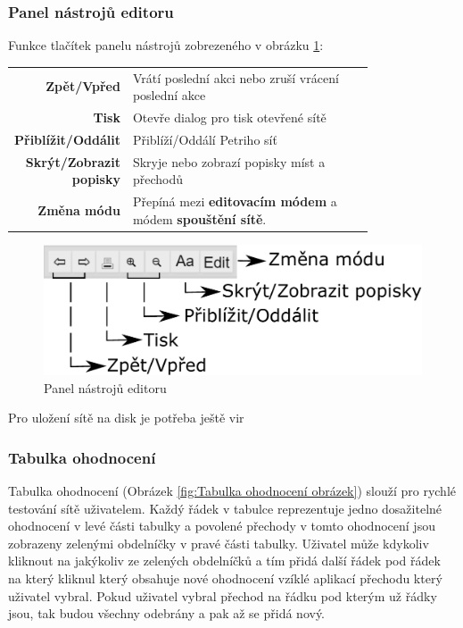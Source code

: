 \documentclass[
  biblatex,
  glossaries,
  index
]{kidiplom}
\begin{document}

\subsubsection{Panel nástrojů editoru}\label{panel nástrojů}

Funkce tlačítek panelu nástrojů zobrezeného v obrázku \ref{fig:Panel nástrojů editoru}:
\begin{center}
  \begin{tabular}{r p{0.8\linewidth}}
    \textbf{Zpět/Vpřed}          & Vrátí poslední akci nebo zruší vrácení poslední akce \\
    \textbf{Tisk}                & Otevře dialog pro tisk otevřené sítě \\
    \textbf{Přiblížit/Oddálit}   & Přiblíží/Oddálí Petriho síť \\
    \textbf{Skrýt/Zobrazit popisky}  & Skryje nebo zobrazí popisky míst a přechodů \\
    \textbf{Změna módu}  & Přepíná mezi \textbf{editovacím módem} a módem \textbf{spouštění sítě}. \\
  \end{tabular}
\end{center}


\begin{figure}[h]
  \centering
  \includegraphics[width=\linewidth]{bar}
  \caption{Panel nástrojů editoru}\label{fig:Panel nástrojů editoru}
\end{figure}


Pro uložení sítě na disk je potřeba ještě vir


\subsubsection{Tabulka ohodnocení}\label{tabulka ohodnocení}

Tabulka ohodnocení (Obrázek \ref{fig:Tabulka ohodnocení obrázek}) slouží pro rychlé testování sítě uživatelem.
Každý řádek v tabulce reprezentuje jedno dosažitelné ohodnocení 
v levé části tabulky a povolené přechody v tomto ohodnocení jsou 
zobrazeny zelenými obdelníčky v pravé části tabulky.
Uživatel může kdykoliv kliknout na jakýkoliv ze zelených obdelníčků 
a tím přidá další řádek pod řádek na který kliknul který obsahuje 
nové ohodnocení vzíklé aplikací přechodu který uživatel vybral.
Pokud uživatel vybral přechod na řádku pod kterým už řádky jsou, 
tak budou všechny odebrány a pak až se přidá nový.
\end{document}
